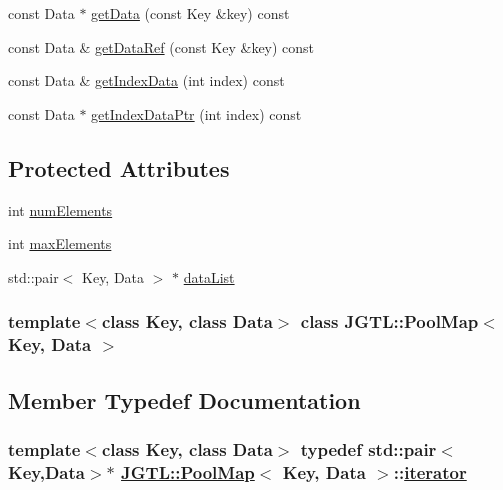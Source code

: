 \begin{CompactItemize}
\item 
const Data $\ast$ \hyperlink{class_j_g_t_l_1_1_pool_map_7b04eb59001beed06626bde7622a42d0}{get\-Data} (const Key \&key) const 
\item 
const Data \& \hyperlink{class_j_g_t_l_1_1_pool_map_27a40fef553c59284fc28621fd7515b5}{get\-Data\-Ref} (const Key \&key) const 
\item 
const Data \& \hyperlink{class_j_g_t_l_1_1_pool_map_9f6083416f0d4896c13003adb5c9b935}{get\-Index\-Data} (int index) const
\item 
const Data $\ast$ \hyperlink{class_j_g_t_l_1_1_pool_map_68006d0d7c9195990a8d24dab585ce01}{get\-Index\-Data\-Ptr} (int index) const
\end{CompactItemize}
\subsection*{Protected Attributes}
\begin{CompactItemize}
\item 
int \hyperlink{class_j_g_t_l_1_1_pool_map_973160447230898cb7e0dd73ad675879}{num\-Elements}
\item 
int \hyperlink{class_j_g_t_l_1_1_pool_map_15fff9edc5d43282b599db47bfbd31f5}{max\-Elements}
\item 
std::pair$<$ Key, Data $>$ $\ast$ \hyperlink{class_j_g_t_l_1_1_pool_map_0f8e82d573853a0b6bf943f277106f7f}{data\-List}
\end{CompactItemize}
\subsubsection*{template$<$class Key, class Data$>$ class JGTL::Pool\-Map$<$ Key, Data $>$}



\subsection{Member Typedef Documentation}
\hypertarget{class_j_g_t_l_1_1_pool_map_b3af40821696ebcf9f62a3e9d91324ee}{
\subsubsection[iterator]{\setlength{\rightskip}{0pt plus 5cm}template$<$class Key, class Data$>$ typedef std::pair$<$Key,Data$>$$\ast$ \hyperlink{class_j_g_t_l_1_1_pool_map}{JGTL::Pool\-Map}$<$ Key, Data $>$::\hyperlink{class_j_g_t_l_1_1_pool_map_b3af40821696ebcf9f62a3e9d91324ee}{iterator}}}
\label{class_j_g_t_l_1_1_pool_map_b3af40821696ebcf9f62a3e9d91324ee}


